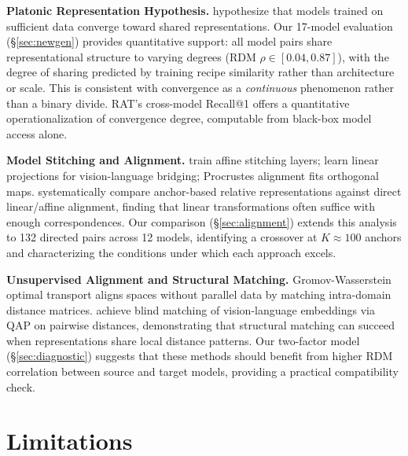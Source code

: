 \documentclass{article}
\begin{document}
\textbf{Platonic Representation Hypothesis.} \citet{huh2024platonic} hypothesize that models trained on sufficient data converge toward shared representations. Our 17-model evaluation (\S\ref{sec:newgen}) provides quantitative support: all model pairs share representational structure to varying degrees (RDM $\rho \in [0.04, 0.87]$), with the degree of sharing predicted by training recipe similarity rather than architecture or scale. This is consistent with convergence as a \emph{continuous} phenomenon rather than a binary divide. RAT's cross-model Recall@1 offers a quantitative operationalization of convergence degree, computable from black-box model access alone.

\textbf{Model Stitching and Alignment.} \citet{bansal2021revisiting} train affine stitching layers; \citet{merullo2022linearly} learn linear projections for vision-language bridging; Procrustes alignment \citep{conneau2018word} fits orthogonal maps. \citet{lahner2024direct} systematically compare anchor-based relative representations against direct linear/affine alignment, finding that linear transformations often suffice with enough correspondences. Our comparison (\S\ref{sec:alignment}) extends this analysis to 132 directed pairs across 12 models, identifying a crossover at $K \approx 100$ anchors and characterizing the conditions under which each approach excels.

\textbf{Unsupervised Alignment and Structural Matching.} Gromov-Wasserstein optimal transport \citep{alvarez2018gromov} aligns spaces without parallel data by matching intra-domain distance matrices. \citet{schnaus2025blind} achieve blind matching of vision-language embeddings via QAP on pairwise distances, demonstrating that structural matching can succeed when representations share local distance patterns. Our two-factor model (\S\ref{sec:diagnostic}) suggests that these methods should benefit from higher RDM correlation between source and target models, providing a practical compatibility check.

\section{Limitations}
\label{sec:limitations}
\end{document}
